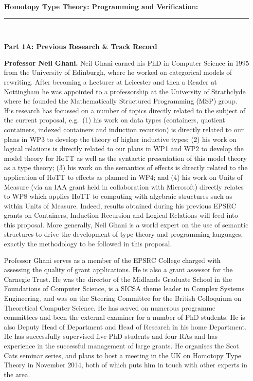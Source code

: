 \documentclass[a4paper,11pt]{article}
\newcommand{\eg}{{e.g.}\ }
\begin{document}
\thispagestyle{plain}
\begin{center}
  {\Large {\bf Homotopy Type Theory: Programming and Verification:}}\\[1ex] 

\vspace*{-0.1in}

  \rule{140mm}{.5mm}\\[2ex]
\end{center}

\noindent
{\bf \Large Part 1A: Previous Research \& Track Record}

\textbf{Professor Neil Ghani.} Neil Ghani earned his PhD in Computer
Science in 1995 from the University of Edinburgh, where he worked on
categorical models of rewriting.  After becoming a Lecturer at
Leicester and then a Reader at Nottingham he was appointed to a
professorship at the University of Strathclyde where he founded the
Mathematically Structured Programming (MSP) group. His research has
focussed on a number of topics directly related to the subject of the
current proposal, \eg (1) his work on data types (containers, quotient
containers, indexed containers and induction recursion) is directly
related to our plans in WP3 to develop the theory of higher inductive
types; (2) his work on logical relations is directly related to our
plans in WP1 and WP2 to develop the model theory for HoTT as well as
the syntactic presentation of this model theory as a type theory; (3)
his work on the semantics of effects is directly related to the
application of HoTT to effects as planned in WP4; and (4) his work on
Units of Measure (via an IAA grant held in collaboration with
Microsoft) directly relates to WP8 which applies HoTT to computing
with algebraic structures such as within Units of Measure. Indeed,
results obtained during his previous EPSRC grants on Containers,
Induction Recursion and Logical Relations will feed into this
proposal.  More generally, Neil Ghani is a world expert on the use of
semantic structures to drive the development of type theory and
programming languages, exactly the methodology to be followed in this
proposal.

Professor Ghani serves as a member of the EPSRC College charged with
assessing the quality of grant applications. He is also a grant
assessor for the Carnegie Trust.  He was the director of the Midlands
Graduate School in the Foundations of Computer Science, is a SICSA
theme leader in Complex Systems Engineering, and was on the Steering
Committee for the British Colloquium on Theoretical Computer Science.
He has served on numerous programme committees and been the external
examiner for a number of PhD students. He is also Deputy Head of
Department and Head of Research in his home Department. He has
successfully supervised five PhD students and four RAs and has
experience in the successful management of large grants. He organises
the Scot Cats seminar series, and plans to host a meeting in the UK on
Homotopy Type Theory in November 2014, both of which puts him in touch
with other experts in the area.
\end{document}
